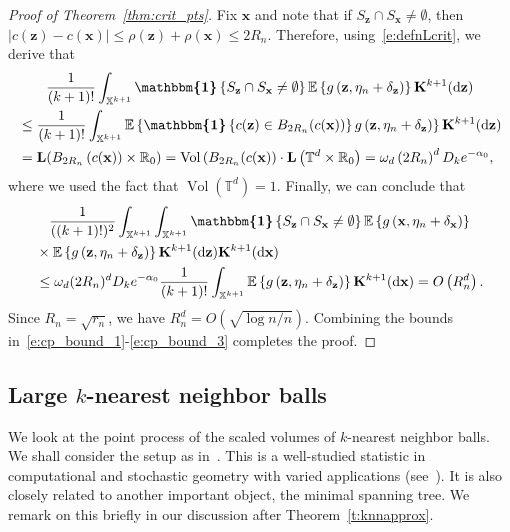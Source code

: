 \documentclass[10pt]{amsart}
\theoremstyle{definition}\newtheorem{defi}[theo]{Definition}\newtheorem{rema}[theo]{Remark}\newtheorem{exam}[theo]{Example}\newtheorem{exem}[theo]{Example}\newtheorem{nota}[theo]{Notation}
\DeclareMathOperator{\vol}{Vol}
\newcommand*\bL{\mathbf{L}}
\newcommand*\bK{\mathbf{K}}
\newcommand{\bz}{\mathbf{z}}
\newcommand{\bx}{\mathbf{x}}
\newcommand*\R{\mathbb{R}}
\newcommand*\T{\mathbb{T}}
\newcommand*\X{\mathbb{X}}
\newcommand{\E}{\mathbb{E}}
\newcommand*\md{\mathrm{d}}
\newcommand{\mean}[1] {\E\left\{{#1}\right\}}
\newcommand{\ind}{\boldsymbol{\mathbbm{1}}}
\newcommand{\set}[1]{\left\{#1\right\}}
\begin{document}
\begin{proof}[Proof of Theorem~\ref{thm:crit_pts}]
Fix $\bx$ and note that if $S_{\bz} \cap S_{\bx} \ne \emptyset$, then $|c(\bz)-c(\bx)| \le \rho(\bz)+\rho(\bx) \le 2R_n$. Therefore, using~\eqref{e:defnLcrit}, we derive that
\begin{multline*}
\frac{1}{(k+1)!}\int_{\X^{k+1}}\ind\set{S_{\bz}\cap S_{\bx}\ne \emptyset} \mean{g\left(\bz,\eta_n+\delta_{\bz}\right)} \bK^{k+1}(\md\bz)\\
\begin{aligned}
&\le \frac{1}{(k+1)!}\int_{\X^{k+1}}
\mean{\ind\set{c(\bz)\in B_{2R_n}(c(\bx))}g\left(\bz,\eta_n+\delta_{\bz}\right)} \bK^{k+1}(\md\bz)\\
&= \bL(B_{2R_n}\left(c(\bx))\times \R_0\right) = \vol\left(B_{2R_n}(c(\bx)\right) \cdot \bL\left(\T^d\times\R_0\right) = \omega_d \left(2R_n\right)^d D_k e^{-\alpha_0},
\end{aligned}
\end{multline*}
where we used the fact that $\vol(\T^d) = 1$. Finally, we can conclude that
\begin{multline}\label{e:cp_bound_3}
\frac{1}{((k+1)!)^2}\int_{\X^{k+1}} \int_{\X^{k+1}}\ind\set{S_{\bz}\cap S_{\bx}\ne \emptyset} \mean{g\left(\bx,\eta_n+\delta_{\bx}\right)} \\
\begin{aligned}
&\times\mean{g\left(\bz,\eta_n+\delta_{\bz}\right)} \bK^{k+1}(\md\bz) \bK^{k+1}(\md\bx) \\
&\le \omega_d (2R_n)^d D_k e^{-\alpha_0} \frac{1}{(k+1)!}\int_{\X^{k+1}} \mean{g\left(\bz,\eta_n+\delta_{\bz}\right)}\bK^{k+1}(\md\bx) = O\left(R_n^d\right).
\end{aligned}
\end{multline}
Since $R_n = \sqrt{r_n}$, we have $R_n^d = O(\sqrt{\log n/n})$. Combining the bounds in~\eqref{e:cp_bound_1}-\eqref{e:cp_bound_3} completes the proof.
\end{proof}

\subsection{Large \texorpdfstring{$k$}{k}-nearest neighbor balls}\label{s:knn}
We look at the point process of the scaled volumes of $k$-nearest neighbor balls. We shall consider the setup as in~\cite[Section~4]{Otto2020}. This is a well-studied statistic in computational and stochastic geometry with varied applications (see~\cite[Pg.~342]{Penrose1997}). It is also closely related to another important object, the minimal spanning tree. We remark on this briefly in our discussion after Theorem~\ref{t:knnapprox}.
\end{document}

